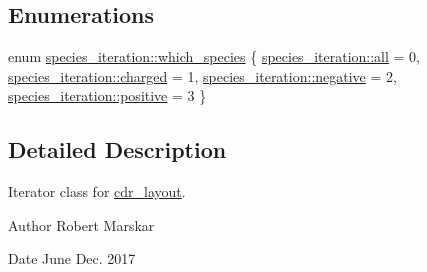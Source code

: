 \subsection*{Enumerations}
\begin{DoxyCompactItemize}
\item 
enum \hyperlink{namespacespecies__iteration_a3384cfe7d9c1a8fa3dbc0c75efc8fb7e}{species\+\_\+iteration\+::which\+\_\+species} \{ \hyperlink{namespacespecies__iteration_a3384cfe7d9c1a8fa3dbc0c75efc8fb7ea26e8600c438a9172a790f5b93e5b359f}{species\+\_\+iteration\+::all} = 0, 
\hyperlink{namespacespecies__iteration_a3384cfe7d9c1a8fa3dbc0c75efc8fb7ea1f40cbecd9cc2690a062e037691639cb}{species\+\_\+iteration\+::charged} = 1, 
\hyperlink{namespacespecies__iteration_a3384cfe7d9c1a8fa3dbc0c75efc8fb7eab23ea9357f75772b1ac5c4de7bca1a00}{species\+\_\+iteration\+::negative} = 2, 
\hyperlink{namespacespecies__iteration_a3384cfe7d9c1a8fa3dbc0c75efc8fb7eab0931fcb7a290beaedce04f930b766be}{species\+\_\+iteration\+::positive} = 3
 \}
\end{DoxyCompactItemize}


\subsection{Detailed Description}
Iterator class for \hyperlink{classcdr__layout}{cdr\+\_\+layout}. 

\begin{DoxyAuthor}{Author}
Robert Marskar 
\end{DoxyAuthor}
\begin{DoxyDate}{Date}
June Dec. 2017 
\end{DoxyDate}
